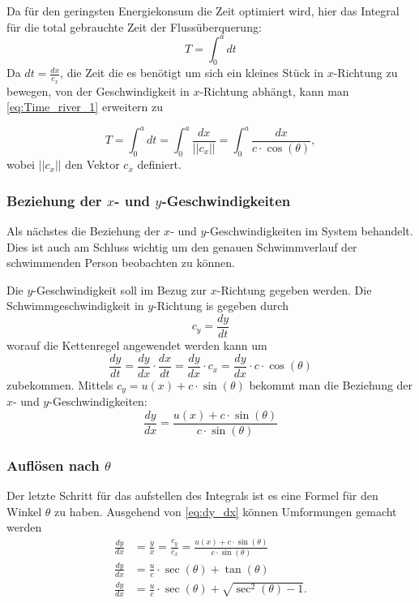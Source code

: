 Da für den geringsten Energiekonsum die Zeit optimiert wird, hier das Integral für die total gebrauchte Zeit der Flussüberquerung:
\begin{equation}
    T = \int_0^adt \label{eq:Time_river_1}
\end{equation}
Da \(dt = \frac{dx}{c_x}\), die Zeit die es benötigt um sich ein kleines Stück in \(x\)-Richtung zu bewegen, von der Geschwindigkeit in \(x\)-Richtung abhängt, kann man \eqref{eq:Time_river_1} erweitern zu

\begin{equation}
    T = \int_0^adt = \int_0^a\frac{dx}{||c_x||} = \int_0^a\frac{dx}{c\cdot \cos(\theta)} \label{eq:Time_river_2},
\end{equation}
wobei \(||c_x||\) den Vektor \(c_x\) definiert. 


\subsubsection{Beziehung der \(x\)- und \(y\)-Geschwindigkeiten}

Als nächstes die Beziehung der \(x\)- und \(y\)-Geschwindigkeiten im System behandelt. Dies ist auch am Schluss wichtig um den genauen Schwimmverlauf der schwimmenden Person beobachten zu können.

Die \(y\)-Geschwindigkeit soll im Bezug zur \(x\)-Richtung gegeben werden. Die Schwimmgeschwindigkeit in \(y\)-Richtung is gegeben durch
\begin{equation}
    c_y = \frac{dy}{dt}
\end{equation}
worauf die Kettenregel angewendet werden kann um
\begin{equation}
    \frac{dy}{dt} = \frac{dy}{dx} \cdot \frac{dx}{dt} = \frac{dy}{dx}\cdot c_x = \frac{dy}{dx}\cdot c\cdot \cos(\theta)
\end{equation}
zubekommen. Mittels \(c_y = u(x) + c\cdot \sin(\theta)\) bekommt man die Beziehung der \(x\)- und \(y\)-Geschwindigkeiten:
\begin{equation}
    \frac{dy}{dx} = \frac{u(x) + c \cdot \sin(\theta)}{c \cdot \sin(\theta)} \label{eq:dy_dx}
\end{equation}



\subsubsection{Auflösen nach \(\theta\)}

Der letzte Schritt für das aufstellen des Integrals ist es eine Formel für den Winkel \(\theta\) zu haben.
Ausgehend von \eqref{eq:dy_dx} können Umformungen gemacht werden
\begin{align}
    \frac{dy}{dx} &= \frac{\dot{y}}{\dot{x}} = \frac{c_y}{c_x} = \frac{u(x) + c \cdot \sin(\theta)}{c \cdot \sin(\theta)} \\
    \frac{dy}{dx} &= \frac{u}{c}\cdot \sec(\theta) + \tan(\theta) \\
    \frac{dy}{dx} &= \frac{u}{c}\cdot \sec(\theta) + \sqrt{\sec^2(\theta)-1}. \\
\end{align}

